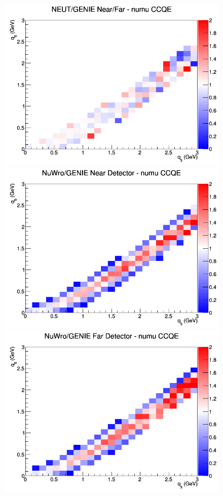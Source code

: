 \documentclass[12pt]{article}
\begin{document}
\begin{figure}[h]
\endminipage
{}
\includegraphics[width=\linewidth]{q0_q3/nominal/ratios/CCQE_NEUT_GENIE_numu_NF_q3_q0.png}
\endminipage
\newline
{}
\includegraphics[width=\linewidth]{q0_q3/nominal/ratios/CCQE_NuWro_GENIE_numu_near_q3_q0.png}
\endminipage
{}
\includegraphics[width=\linewidth]{q0_q3/nominal/ratios/CCQE_NuWro_GENIE_numu_far_q3_q0.png}

\end{figure}
\end{document}

